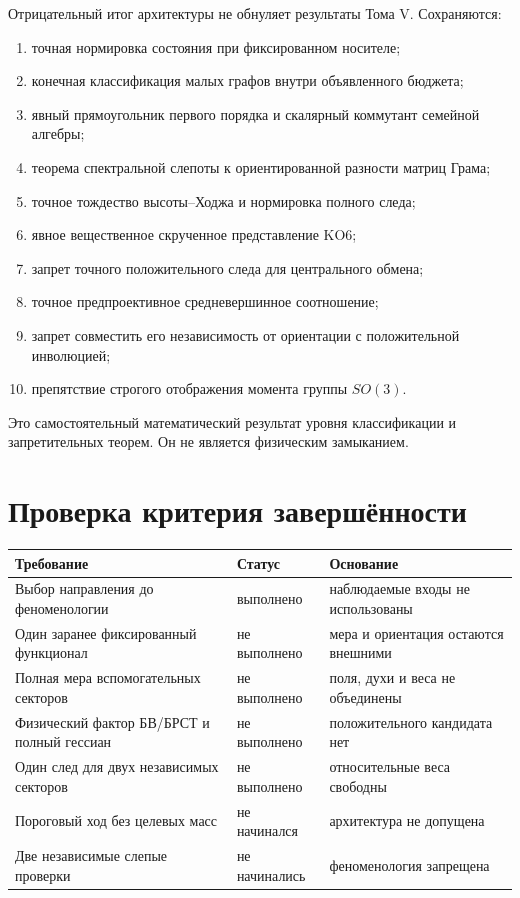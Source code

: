 Отрицательный итог архитектуры не обнуляет результаты Тома V. Сохраняются:
\begin{enumerate}
 \item точная нормировка состояния при фиксированном носителе;
 \item конечная классификация малых графов внутри объявленного бюджета;
 \item явный прямоугольник первого порядка и скалярный коммутант семейной
 алгебры;
 \item теорема спектральной слепоты к ориентированной разности матриц Грама;
 \item точное тождество высоты--Ходжа и нормировка полного следа;
 \item явное вещественное скрученное представление KO6;
 \item запрет точного положительного следа для центрального обмена;
 \item точное предпроективное средневершинное соотношение;
 \item запрет совместить его независимость от ориентации с положительной
 инволюцией;
 \item препятствие строгого отображения момента группы \(SO(3)\).
\end{enumerate}

Это самостоятельный математический результат уровня классификации и
запретительных теорем. Он не является физическим замыканием.

\section{Проверка критерия завершённости}

\begin{center}\small
\begin{tabular}{>{\raggedright\arraybackslash}p{7.2cm}
                  >{\raggedright\arraybackslash}p{2.2cm}
                  >{\raggedright\arraybackslash}p{3.4cm}}
\toprule
Требование & Статус & Основание\\
\midrule
Выбор направления до феноменологии & выполнено & наблюдаемые входы не использованы\\
Один заранее фиксированный функционал & не выполнено & мера и ориентация остаются внешними\\
Полная мера вспомогательных секторов & не выполнено & поля, духи и веса не объединены\\
Физический фактор БВ/БРСТ и полный гессиан & не выполнено & положительного кандидата нет\\
Один след для двух независимых секторов & не выполнено & относительные веса свободны\\
Пороговый ход без целевых масс & не начинался & архитектура не допущена\\
Две независимые слепые проверки & не начинались & феноменология запрещена\\
\bottomrule
\end{tabular}
\end{center}

